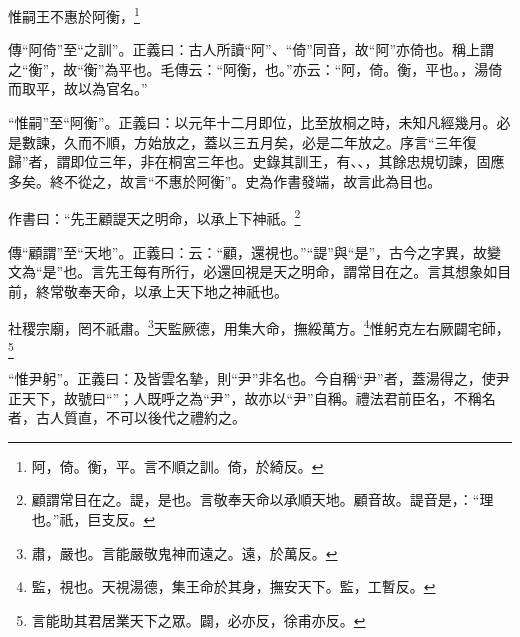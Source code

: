 惟嗣王不惠於阿衡，\footnote{阿，倚。衡，平。言不順之訓。倚，於綺反。}


{\noindent\zhuan{}\fzbyks 傳“阿倚”至“之訓”。正義曰：古人所讀“阿”、“倚”同音，故“阿”亦倚也。稱上謂之“衡”，故“衡”為平也。毛傳云：“阿衡，也。”亦云：“阿，倚。衡，平也。，湯倚而取平，故以為官名。” \par}

{\noindent\shu{}\fzkt “惟嗣”至“阿衡”。正義曰：以元年十二月即位，比至放桐之時，未知凡經幾月。必是數諫，久而不順，方始放之，蓋以三五月矣，必是二年放之。序言“三年復歸”者，謂即位三年，非在桐宮三年也。史錄其訓王，有、、，其餘忠規切諫，固應多矣。終不從之，故言“不惠於阿衡”。史為作書發端，故言此為目也。 \par}

作書曰：“先王顧諟天之明命，以承上下神祇。\footnote{顧謂常目在之。諟，是也。言敬奉天命以承順天地。顧音故。諟音是，：“理也。”祇，巨支反。}

{\noindent\zhuan{}\fzbyks 傳“顧謂”至“天地”。正義曰：云：“顧，還視也。”“諟”與“是”，古今之字異，故變文為“是”也。言先王每有所行，必還回視是天之明命，謂常目在之。言其想象如目前，終常敬奉天命，以承上天下地之神祇也。 \par}

社稷宗廟，罔不祇肅。\footnote{肅，嚴也。言能嚴敬鬼神而遠之。遠，於萬反。}天監厥德，用集大命，撫綏萬方。\footnote{監，視也。天視湯德，集王命於其身，撫安天下。監，工暫反。}惟躬克左右厥闢宅師，\footnote{言能助其君居業天下之眾。闢，必亦反，徐甫亦反。}

{\noindent\shu{}\fzkt “惟尹躬”。正義曰：及皆雲名摯，則“尹”非名也。今自稱“尹”者，蓋湯得之，使尹正天下，故號曰“”；人既呼之為“尹”，故亦以“尹”自稱。禮法君前臣名，不稱名者，古人質直，不可以後代之禮約之。 \par}

